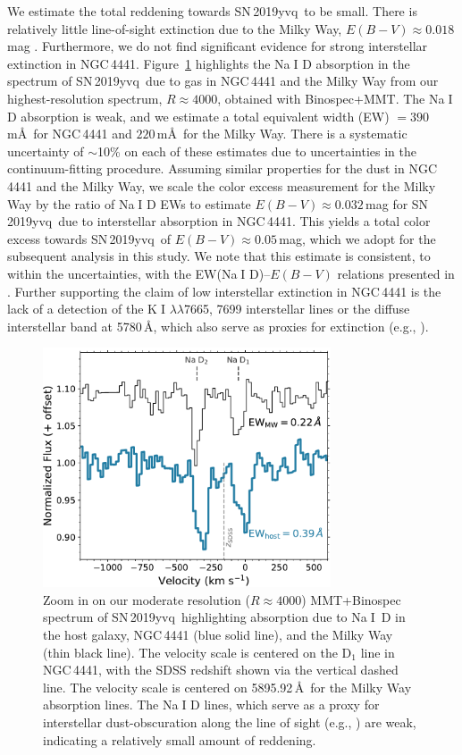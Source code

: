 \documentclass[twocolumn]{aastex63}
\def\ion#1#2{#1$\;${\footnotesize\rm{#2}}\relax}
\newcommand{\sn}{SN\,2019yvq}
\begin{document}
We estimate the total reddening towards \sn\ to be small. There is relatively
little line-of-sight extinction due to the Milky Way, $E(B-V) \approx
0.018$\,mag \citep{Schlafly11, Schlegel98}. Furthermore, we do not find
significant evidence for strong interstellar extinction in NGC\,4441.
Figure~\ref{fig:NaD} highlights the \ion{Na}{I} D absorption in the spectrum
of \sn\ due to gas in NGC\,4441 and the Milky Way from our highest-resolution
spectrum, $R \approx 4000$, obtained with Binospec+MMT. The \ion{Na}{I} D
absorption is weak, and we estimate a total equivalent width (EW) $=
390$\,m\AA\ for NGC\,4441 and $220$\,m\AA\ for the Milky Way. There is a
systematic uncertainty of $\sim$10\% on each of these estimates due to
uncertainties in the continuum-fitting procedure. Assuming similar properties
for the dust in NGC\,4441 and the Milky Way, we scale the color excess
measurement for the Milky Way by the ratio of \ion{Na}{I} D EWs to estimate
$E(B-V) \approx 0.032$\,mag for \sn\ due to interstellar absorption in
NGC\,4441. This yields a total color excess towards \sn\ of $E(B-V) \approx
0.05$\,mag, which we adopt for the subsequent analysis in this study. We note
that this estimate is consistent, to within the uncertainties, with the
EW(\ion{Na}{I} D)--$E(B-V)$ relations presented in \citet{Poznanski12}.
Further supporting the claim of low interstellar extinction in NGC\,4441 is
the lack of a detection of the \ion{K}{I} $\lambda\lambda$7665, 7699
interstellar lines or the diffuse interstellar band at 5780\,\AA, which also
serve as proxies for extinction (e.g., \citealt{Phillips13}).

\begin{figure} \centering \includegraphics[width=3.35in]{./figures/NaD.pdf}
    \caption{Zoom in on our moderate resolution ($R \approx 4000$)
    MMT+Binospec spectrum of \sn\ highlighting absorption due to \ion{Na}{I}~D
    in the host galaxy, NGC\,4441 (blue solid line), and the Milky Way (thin
    black line). The velocity scale is centered on the D$_1$ line in
    NGC\,4441, with the SDSS redshift shown via the vertical dashed line. The
    velocity scale is centered on 5895.92\,\AA\ for the Milky Way absorption
    lines. The \ion{Na}{I} D lines, which serve as a proxy for interstellar
    dust-obscuration along the line of sight (e.g.,
    \citealt{Poznanski12,Phillips13}) are weak, indicating a relatively small
    amount of reddening.}
    \label{fig:NaD}
\end{figure}
\end{document}
